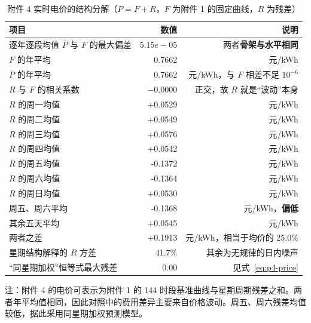 
\begin{table}[htbp]
  \centering
  \caption{附件 4 实时电价的结构分解（$P=F+R$，$F$ 为附件 1 的固定曲线，$R$ 为残差）}
  \label{tab:p4-struct}
  \small
  \begin{tabular}{lrr}
    \toprule
    项目 & 数值 & 说明 \\
    \midrule
    逐年逐段均值 $\overline{P}$ 与 $F$ 的最大偏差 & $5.15e-05$ & 两者\textbf{骨架与水平相同} \\
    $F$ 的年平均 & 0.7662 & 元/kWh \\
    $\overline{P}$ 的年平均 & 0.7662 & 元/kWh，与 $F$ 相差不足 $10^{-6}$ \\
    $R$ 与 $F$ 的相关系数 & $-0.0000$ & 正交，故 $R$ 就是``波动''本身 \\
    \midrule
    $R$ 的周一均值 & +0.0529 & 元/kWh \\
    $R$ 的周二均值 & +0.0549 & 元/kWh \\
    $R$ 的周三均值 & +0.0576 & 元/kWh \\
    $R$ 的周四均值 & +0.0542 & 元/kWh \\
    $R$ 的周五均值 & -0.1372 & 元/kWh \\
    $R$ 的周六均值 & -0.1364 & 元/kWh \\
    $R$ 的周日均值 & +0.0530 & 元/kWh \\
    \midrule
    周五、周六平均 & -0.1368 & 元/kWh，\textbf{偏低} \\
    其余五天平均 & +0.0545 & 元/kWh \\
    两者之差 & +0.1913 & 元/kWh，相当于均价的 25.0\% \\
    星期结构解释的 $R$ 方差 & 41.7\% & 其余为无规律的日内噪声 \\
    ``同星期加权''恒等式最大残差 & $0.00$ & 见式~\eqref{eq:p4-price} \\
    \bottomrule
  \end{tabular}
  \par\vspace{2pt}
  \begin{minipage}{\textwidth}\footnotesize
    注：附件 4 的电价可表示为附件 1 的 144 时段基准曲线与星期周期残差之和。两者年平均值相同，因此对照中的费用差异主要来自价格波动。周五、周六残差均值较低，据此采用同星期加权预测模型。
  \end{minipage}
\end{table}

